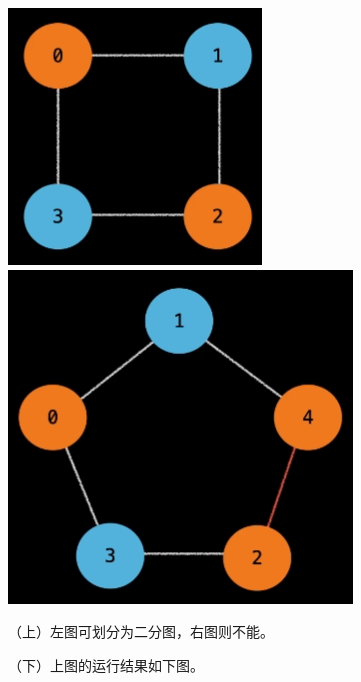 \documentclass[a4paper]{article}    %
\begin{document}
\begin{center}
    \includegraphics[scale=0.4]{12.png}
    \includegraphics[scale=0.4]{13.png}
\end{center}

（上）左图可划分为二分图，右图则不能。

（下）上图的运行结果如下图。
\end{document}
